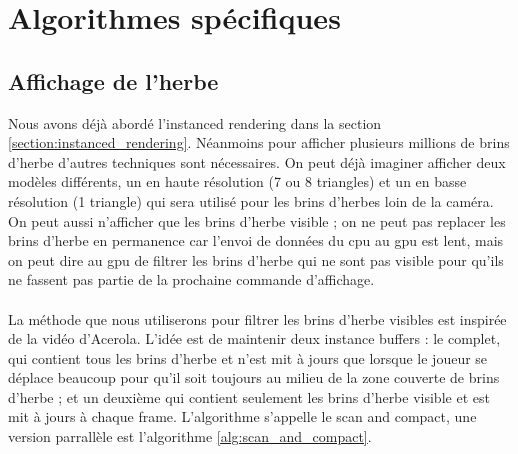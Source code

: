 \documentclass[11pt]{article} %
\begin{document}
\subsubsection{} %




\section{Algorithmes spécifiques}


\subsection{Affichage de l'herbe}
\label{section:grass_rendering}

Nous avons déjà abordé l'instanced rendering dans la section \ref{section:instanced_rendering}. Néanmoins pour afficher plusieurs millions de brins d'herbe d'autres techniques sont nécessaires. On peut déjà imaginer afficher deux modèles différents, un en haute résolution (7 ou 8 triangles) et un en basse résolution (1 triangle) qui sera utilisé pour les brins d'herbes loin de la caméra. On peut aussi n'afficher que les brins d'herbe visible ; on ne peut pas replacer les brins d'herbe en permanence car l'envoi de données du cpu au gpu est lent, mais on peut dire au gpu de filtrer les brins d'herbe qui ne sont pas visible pour qu'ils ne fassent pas partie de la prochaine commande d'affichage.

\paragraph{}
La méthode que nous utiliserons pour filtrer les brins d'herbe visibles est inspirée de la vidéo d'Acerola\cite{grass_rendering}. L'idée est de maintenir deux instance buffers : le complet, qui contient tous les brins d'herbe et n'est mit à jours que lorsque le joueur se déplace beaucoup pour qu'il soit toujours au milieu de la zone couverte de brins d'herbe ; et un deuxième qui contient seulement les brins d'herbe visible et est mit à jours à chaque frame. L'algorithme s'appelle le scan and compact, une version parrallèle est l'algorithme \ref{alg:scan_and_compact}.
\end{document}
